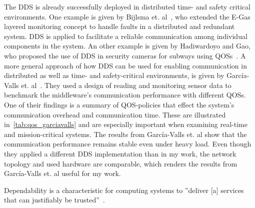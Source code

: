 The \gls*{DDS} is already successfully deployed in distributed time- and safety critical environments.
One example is given by Bijlsma et. al~\cite{DistributedSafety2020}, who extended the E-Gas layered monitoring concept to handle faults in a distributed and redundant system.
\Gls*{DDS} is applied to facilitate a reliable communication among individual components in the system.
An other example is given by Hadiwardoyo and Gao, who proposed the use of \gls*{DDS} in security cameras for subways using \glspl*{QOS}~\cite{DDSInSubways}.
A more general approach of how \gls*{DDS} can be used for enabling communication in distributed as well as time- and safety-critical environments, is given by García-Valls et. al~\cite{GarciaVallsDDSInDistributed}.
They used a design of reading and monitoring sensor data to benchmark the middleware's communication performance with different \glspl*{QOS}.
One of their findings is a summary of \gls*{QOS}-policies that effect the system's communication overhead and communication time.
These are illustrated in~\autoref{tab:qos_garciavalls} and are especially important when examining real-time and mission-critical systems.
The results from García-Valls et. al show that the communication performance remains stable even under heavy load.
Even though they applied a different \gls*{DDS} implementation than in my work, the network topology and used hardware are comparable, which renders the results from García-Valls et. al useful for my work.


\iffalse










































Dependability is a characteristic for computing systems to ''deliver [a] services that can justifiably be trusted''~\cite{AvizienisDependability2001}.


